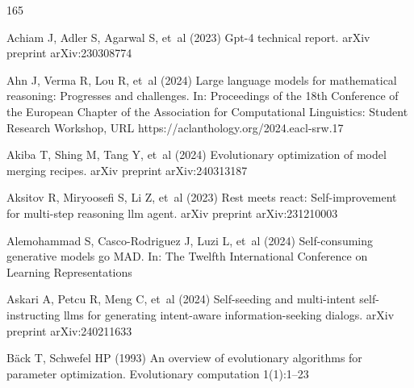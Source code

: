 \documentclass[sn-basic, Numbered]{sn-jnl}%
\theoremstyle{thmstyleone}%
\theoremstyle{thmstyletwo}%
\theoremstyle{thmstylethree}%
\begin{document}
\begin{appendices}



\end{appendices}

\begin{thebibliography}{165}
\providecommand{\natexlab}[1]{#1}
\providecommand{\url}[1]{{#1}}
\providecommand{\urlprefix}{URL }
\providecommand{\doi}[1]{\url{https://doi.org/#1}}
\providecommand{\eprint}[2][]{\url{#2}}
 \bibcommenthead

Achiam J, Adler S, Agarwal S, et~al (2023) Gpt-4 technical report. arXiv preprint arXiv:230308774

Ahn J, Verma R, Lou R, et~al (2024) Large language models for mathematical reasoning: Progresses and challenges. In: Proceedings of the 18th Conference of the European Chapter of the Association for Computational Linguistics: Student Research Workshop, \urlprefix\url{https://aclanthology.org/2024.eacl-srw.17}

Akiba T, Shing M, Tang Y, et~al (2024) Evolutionary optimization of model merging recipes. arXiv preprint arXiv:240313187

Aksitov R, Miryoosefi S, Li Z, et~al (2023) Rest meets react: Self-improvement for multi-step reasoning llm agent. arXiv preprint arXiv:231210003

Alemohammad S, Casco-Rodriguez J, Luzi L, et~al (2024) Self-consuming generative models go {MAD}. In: The Twelfth International Conference on Learning Representations

Askari A, Petcu R, Meng C, et~al (2024) Self-seeding and multi-intent self-instructing llms for generating intent-aware information-seeking dialogs. arXiv preprint arXiv:240211633

B{\"a}ck T, Schwefel HP (1993) An overview of evolutionary algorithms for parameter optimization. Evolutionary computation 1(1):1--23


\end{thebibliography}
\end{document}

